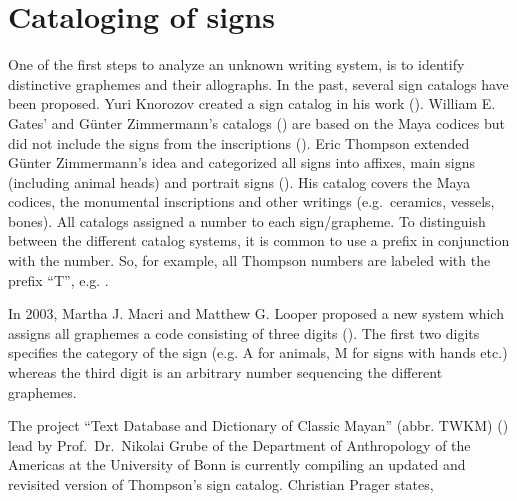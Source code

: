 \documentclass[../main.tex]{subfiles}
\begin{document}
\section{Cataloging of signs}
One of the first steps to analyze an unknown writing system, is to identify distinctive graphemes 
and their allographs. 
In the past, several sign catalogs have been proposed.
Yuri Knorozov created a sign catalog in his work (\cite[109\psq]{knorozov1967}).
William E. Gates' and G\"unter Zimmermann's catalogs (\cites{gates1931}{zimmermann1956}) are 
based on the Maya codices but did not include the signs from the inscriptions 
(\cite[4]{thompson1962catalog}). 
Eric Thompson extended G\"unter Zimmermann's idea and categorized all signs into affixes, main signs 
(including animal heads) and portrait signs (\cite[4]{thompson1962catalog}).
His catalog covers the Maya codices, the monumental inscriptions and other writings 
(e.g.\ ceramics, vessels, bones).
All catalogs assigned a number to each sign/grapheme.
To distinguish between the different catalog systems, it is common to use a prefix in 
conjunction with the number.
So, for example, all Thompson numbers are labeled with the prefix ``T'', e.g. .

In 2003, Martha J. Macri and Matthew G. Looper proposed a new system which assigns all graphemes
a code consisting of three digits (\cite[21,25]{macrilooper2003}).
The first two digits specifies the category of the sign 
(e.g. A for animals, M for signs with hands etc.) whereas the third digit is an arbitrary number
sequencing the different graphemes.

The project ``Text Database and Dictionary of Classic Mayan'' (abbr. TWKM) (\cite{twkm2014}) lead by 
Prof.\ Dr.\ Nikolai Grube of the Department of Anthropology of the Americas at the University of 
Bonn is currently compiling an updated and revisited version of Thompson's sign catalog.
Christian Prager states, 
\end{document}
